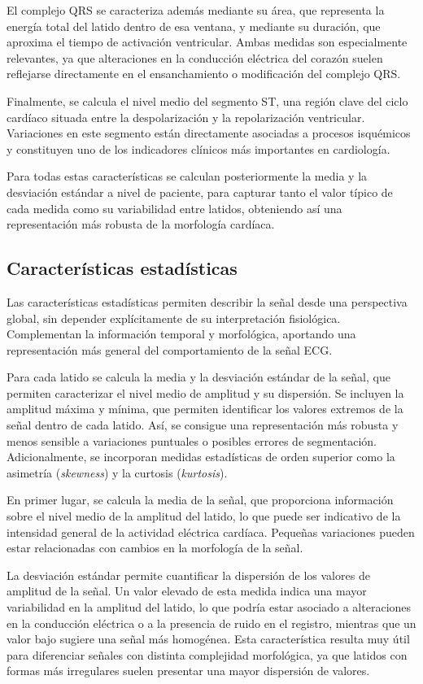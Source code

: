 \documentclass[12pt,a4paper,twoside]{book}
\begin{document}
El complejo QRS se caracteriza además mediante su área, que representa la energía total del latido dentro de esa ventana, y mediante su duración, que aproxima el tiempo de activación ventricular. 
Ambas medidas son especialmente relevantes, ya que alteraciones en la conducción eléctrica del corazón suelen reflejarse directamente en el ensanchamiento o modificación del complejo QRS.

Finalmente, se calcula el nivel medio del segmento ST, una región clave del ciclo cardíaco situada entre la despolarización y la repolarización ventricular. 
Variaciones en este segmento están directamente asociadas a procesos isquémicos y constituyen uno de los indicadores clínicos más importantes en cardiología.

Para todas estas características se calculan posteriormente la media y la desviación estándar a nivel de paciente, para capturar tanto el valor típico de cada medida como su variabilidad entre latidos, obteniendo así una representación más robusta de la morfología cardíaca.

\subsection{Características estadísticas}

Las características estadísticas permiten describir la señal desde una perspectiva global, sin depender explícitamente de su interpretación fisiológica. 
Complementan la información temporal y morfológica, aportando una representación más general del comportamiento de la señal ECG.

Para cada latido se calcula la media y la desviación estándar de la señal, que permiten caracterizar el nivel medio de amplitud y su dispersión. 
Se incluyen la amplitud máxima y mínima, que permiten identificar los valores extremos de la señal dentro de cada latido.
Así, se consigue una representación más robusta y menos sensible a variaciones puntuales o posibles errores de segmentación.
Adicionalmente, se incorporan medidas estadísticas de orden superior como la asimetría (\textit{skewness}) y la curtosis (\textit{kurtosis}).

En primer lugar, se calcula la media de la señal, que proporciona información sobre el nivel medio de la amplitud del latido, lo que puede ser indicativo de la intensidad general de la actividad eléctrica cardíaca.
Pequeñas variaciones pueden estar relacionadas con cambios en la morfología de la señal.

La desviación estándar permite cuantificar la dispersión de los valores de amplitud de la señal. 
Un valor elevado de esta medida indica una mayor variabilidad en la amplitud del latido, lo que podría estar asociado a alteraciones en la conducción eléctrica o a la presencia de ruido en el registro, mientras que un valor bajo sugiere una señal más homogénea.
Esta característica resulta muy útil para diferenciar señales con distinta complejidad morfológica, ya que latidos con formas más irregulares suelen presentar una mayor dispersión de valores.
\end{document}
